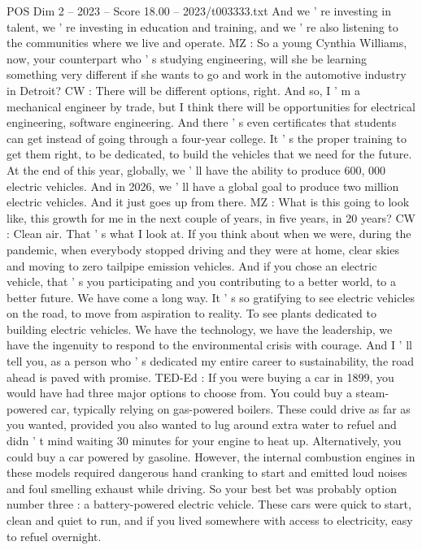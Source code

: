 \begin{textsample}{POS Dim 2 – 2023 – Score 18.00 – 2023/t003333.txt}
And we ' re investing in talent, we ' re investing in education and training, and we ' re also listening to the communities where we live and operate.
MZ : So a young Cynthia Williams, now, your counterpart who ' s studying engineering, will she be learning something very different if she wants to go and work in the automotive industry in Detroit?
CW : There will be different options, right.
And so, I ' m a mechanical engineer by trade, but I think there will be opportunities for electrical engineering, software engineering.
And there ' s even certificates that students can get instead of going through a four-year college.
It ' s the proper training to get them right, to be dedicated, to build the vehicles that we need for the future.
At the end of this year, globally, we ' ll have the ability to produce 600, 000 electric vehicles.
And in 2026, we ' ll have a global goal to produce two million electric vehicles.
And it just goes up from there.
MZ : What is this going to look like, this growth for me in the next couple of years, in five years, in 20 years?
CW : Clean air.
That ' s what I look at.
If you think about when we were, during the pandemic, when everybody stopped driving and they were at home, clear skies and moving to zero tailpipe emission vehicles.
And if you chose an electric vehicle, that ' s you participating and you contributing to a better world, to a better future.
We have come a long way.
It ' s so gratifying to see electric vehicles on the road, to move from aspiration to reality.
To see plants dedicated to building electric vehicles.
We have the technology, we have the leadership, we have the ingenuity to respond to the environmental crisis with courage.
And I ' ll tell you, as a person who ' s dedicated my entire career to sustainability, the road ahead is paved with promise.
TED-Ed : If you were buying a car in 1899, you would have had three major options to choose from.
You could buy a steam-powered car, typically relying on gas-powered boilers.
These could drive as far as you wanted, provided you also wanted to lug around extra water to refuel and didn ' t mind waiting 30 minutes for your engine to heat up.
Alternatively, you could buy a car powered by gasoline.
However, the internal combustion engines in these models required dangerous hand cranking to start and emitted loud noises and foul smelling exhaust while driving.
So your best bet was probably option number three : a battery-powered electric vehicle.
These cars were quick to start, clean and quiet to run, and if you lived somewhere with access to electricity, easy to refuel overnight.

\end{textsample}
